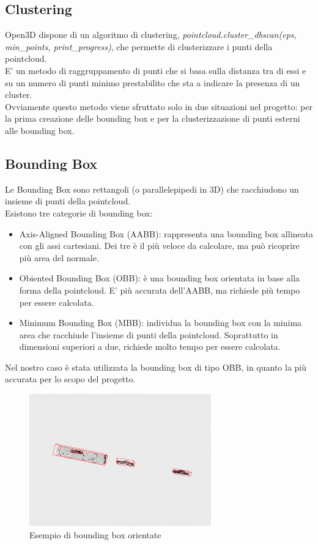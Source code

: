 \documentclass[italian]{report}
\begin{document}
\subsection{Clustering}
Open3D dispone di un algoritmo di clustering, \textit{pointcloud.cluster\_dbscan(eps, min\_points, print\_progress)}, che permette di clusterizzare i punti della pointcloud.\\
E' un metodo di raggruppamento di punti che si basa sulla distanza tra di essi e su un numero di punti minimo prestabilito che sta a indicare la presenza di un cluster.\\
Ovviamente questo metodo viene sfruttato solo in due situazioni nel progetto: per la prima creazione delle bounding box e per la clusterizzazione di punti esterni alle bounding box.
\subsection{Bounding Box}
Le Bounding Box sono rettangoli (o parallelepipedi in 3D) che racchiudono un insieme di punti della pointcloud.\\
Esistono tre categorie di bounding box:
\begin{itemize}
	\item Axis-Aligned Bounding Box (AABB): rappresenta una bounding box allineata con gli assi cartesiani. Dei tre è il più veloce da calcolare, ma può ricoprire più area del normale.
	\item Obiented Bounding Box (OBB): è una bounding box orientata in base alla forma della pointcloud. E' più accurata dell'AABB, ma richiede più tempo per essere calcolata.
	\item Minimum Bounding Box (MBB): individua la bounding box con la minima area che racchiude l'insieme di punti della pointcloud. Soprattutto in dimensioni superiori a due, richiede molto tempo per essere calcolata.
\end{itemize}
Nel nostro caso è stata utilizzata la bounding box di tipo OBB, in quanto la più accurata per lo scopo del progetto.
\begin{figure}[H]
	\centering
	\includegraphics[width=0.7\textwidth]{bbox}
	\footnotesize
	\caption{Esempio di bounding box orientate}
\end{figure}\\
\end{document}
